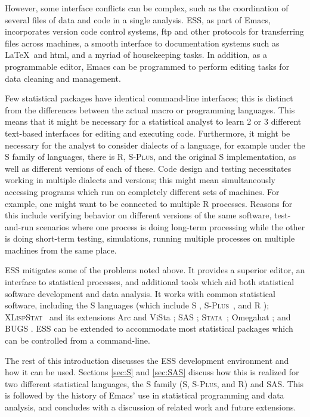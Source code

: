\documentclass{article}
\newcommand*{\Splus}{\textsc{S-Plus}}
\newcommand*{\XLispStat}{\textsc{XLispStat}}
\newcommand*{\Stata}{\textsc{Stata}}
\begin{document}
However, some interface conflicts can be complex, such as the
coordination of several files of data and code in a single analysis.
ESS, as part of Emacs, incorporates version code control systems, ftp
and other protocols for transferring files across machines, a smooth
interface to documentation systems such as \LaTeX\ and html, and a
myriad of housekeeping tasks.  In addition, as a programmable editor,
Emacs can be programmed to perform editing tasks for data cleaning and
management.

Few statistical packages have identical command-line interfaces; this
is distinct from the differences between the actual macro or
programming languages.  This means that it might be necessary for a
statistical analyst to learn 2 or 3 different text-based interfaces
for editing and executing code.  Furthermore, it might be necessary
for the analyst to consider dialects of a language, for example under
the S family of languages, there is R, \Splus, and the original S
implementation, as well as different versions of each of these.  Code
design and testing necessitates working in multiple dialects and
versions; this might mean simultaneously accessing programs which run
on completely different sets of machines.  For example, one might want
to be connected to multiple R processes.  Reasons for this include
verifying behavior on different versions of the same software,
test-and-run scenarios where one process is doing long-term processing
while the other is doing short-term testing, simulations, running
multiple processes on multiple machines from the same place.

ESS mitigates some of the problems noted above.  It provides a
superior editor, an interface to statistical processes, and additional
tools which aid both statistical software development and data
analysis.  It works with common statistical software, including the S
languages (which include S \citep{BecRCW88,ChaJH92,ChaJ98}, \Splus\ 
\citep{Splus}, and R \citep{ihak:gent:1996}); \XLispStat\ 
\citep{Tier90} and its extensions Arc \citep{Cook:Weisberg:1999} and
ViSta \citep{youn:fald:mcfa:1992}; SAS \citep{SAS:8.0}; \Stata\ 
\citep{Stata:6.0}; Omegahat \citep{DTLang:2000}; and BUGS
\citep{SpieThomBest:1999}.  ESS can be extended to accommodate most
statistical packages which can be controlled from a command-line.

The rest of this introduction discusses the ESS development
environment and how it can be used.  Sections \ref{sec:S} and
\ref{sec:SAS} discuss how this is realized for two different
statistical languages, the S family (S, \Splus, and R) and SAS.  This
is followed by the history of Emacs' use in statistical programming
and data analysis, and concludes with a discussion of related work and
future extensions.
\end{document}
